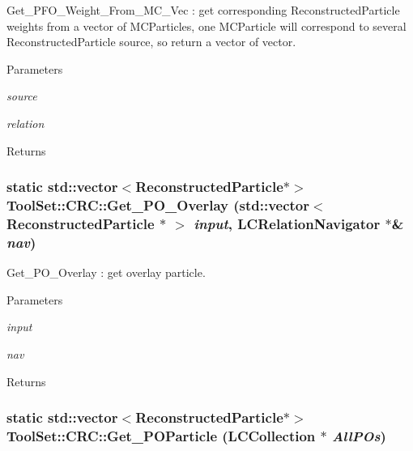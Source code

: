 Get\_\-PFO\_\-Weight\_\-From\_\-MC\_\-Vec : get corresponding ReconstructedParticle weights from a vector of MCParticles, one MCParticle will correspond to several ReconstructedParticle source, so return a vector of vector. 
\begin{DoxyParams}{Parameters}
\item[{\em source}]\item[{\em relation}]\end{DoxyParams}
\begin{DoxyReturn}{Returns}

\end{DoxyReturn}
\hypertarget{classToolSet_1_1CRC_a4ebcccc808e546491c383b327bcc029d}{
\subsubsection[{Get\_\-PO\_\-Overlay}]{\setlength{\rightskip}{0pt plus 5cm}static std::vector$<$ReconstructedParticle$\ast$$>$ ToolSet::CRC::Get\_\-PO\_\-Overlay (std::vector$<$ ReconstructedParticle $\ast$ $>$ {\em input}, \/  LCRelationNavigator $\ast$\& {\em nav})}}
\label{classToolSet_1_1CRC_a4ebcccc808e546491c383b327bcc029d}


Get\_\-PO\_\-Overlay : get overlay particle. 
\begin{DoxyParams}{Parameters}
\item[{\em input}]\item[{\em nav}]\end{DoxyParams}
\begin{DoxyReturn}{Returns}

\end{DoxyReturn}
\hypertarget{classToolSet_1_1CRC_acc5d3da66cadce82d9981f5b24a1c91a}{
\subsubsection[{Get\_\-POParticle}]{\setlength{\rightskip}{0pt plus 5cm}static std::vector$<$ReconstructedParticle$\ast$$>$ ToolSet::CRC::Get\_\-POParticle (LCCollection $\ast$ {\em AllPOs})}}
\label{classToolSet_1_1CRC_acc5d3da66cadce82d9981f5b24a1c91a}


